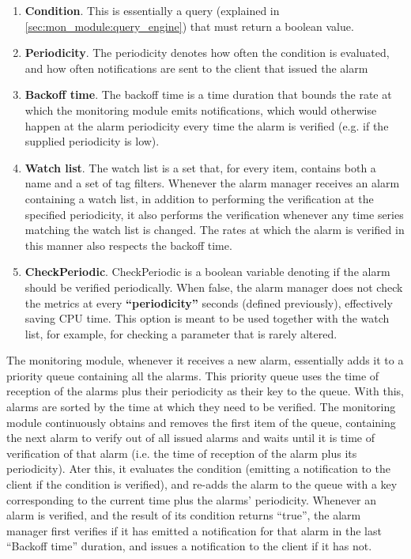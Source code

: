 \begin{enumerate}
    \item \textbf{Condition}. This is essentially a query (explained in \ref{sec:mon_module:query_engine}) that must return a boolean value.
    
    \item \textbf{Periodicity}. The periodicity denotes how often the condition is evaluated, and how often notifications are sent to the client that issued the alarm
    
    \item \textbf{Backoff time}. The backoff time is a time duration that bounds the rate at which the monitoring module emits notifications, which would otherwise happen at the alarm periodicity every time the alarm is verified (e.g. if the supplied periodicity is low).
    
    \item \textbf{Watch list}. The watch list is a set that, for every item, contains both a name and a set of tag filters. Whenever the alarm manager receives an alarm containing a watch list, in addition to performing the verification at the specified periodicity, it also performs the verification whenever any time series matching the watch list is changed. The rates at which the alarm is verified in this manner also respects the backoff time.
    
    \item \textbf{CheckPeriodic}. CheckPeriodic is a boolean variable denoting if the alarm should be verified periodically. When false, the alarm manager does not check the metrics at every \textbf{``periodicity''} seconds (defined previously), effectively saving CPU time. This option is meant to be used together with the watch list, for example, for checking a parameter that is rarely altered.
    
\end{enumerate}

The monitoring module, whenever it receives a new alarm, essentially adds it to a priority queue containing all the alarms. This priority queue uses the time of reception of the alarms plus their periodicity as their key to the queue. With this, alarms are sorted by the time at which they need to be verified. The monitoring module continuously obtains and removes the first item of the queue, containing the next alarm to verify out of all issued alarms and waits until it is time of verification of that alarm (i.e. the time of reception of the alarm plus its periodicity). Ater this, it evaluates the condition (emitting a notification to the client if the condition is verified), and re-adds the alarm to the queue with a key corresponding to the current time plus the alarms' periodicity. Whenever an alarm is verified, and the result of its condition returns ``true'', the alarm manager first verifies if it has emitted a notification for that alarm in the last ``Backoff time'' duration, and issues a notification to the client if it has not.